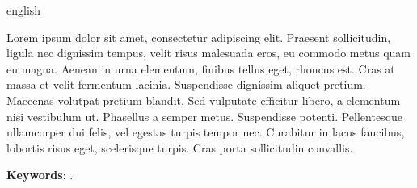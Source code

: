 %
%
%

\setlength{\absparsep}{18pt}
\begin{resumo}[Abstract]
\begin{otherlanguage*}{english}

Lorem ipsum dolor sit amet, consectetur adipiscing elit. Praesent sollicitudin,
ligula nec dignissim tempus, velit risus malesuada eros, eu commodo metus quam
eu magna. Aenean in urna elementum, finibus tellus eget, rhoncus est. Cras at
massa et velit fermentum lacinia. Suspendisse dignissim aliquet pretium.
Maecenas volutpat pretium blandit. Sed vulputate efficitur libero, a elementum
nisi vestibulum ut. Phasellus a semper metus. Suspendisse potenti. Pellentesque
ullamcorper dui felis, vel egestas turpis tempor nec. Curabitur in lacus
faucibus, lobortis risus eget, scelerisque turpis. Cras porta sollicitudin
convallis.
 
\textbf{Keywords}: \imprimirkeywords.
\end{otherlanguage*}
\end{resumo}

